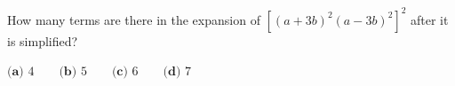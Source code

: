 How many terms are there in the expansion of $\left[(a+3b)^2(a-3b)^2\right]^2$ after it is simplified?

$\textbf{(a) }4\qquad\textbf{(b) }5\qquad\textbf{(c) }6\qquad\textbf{(d) }7$
